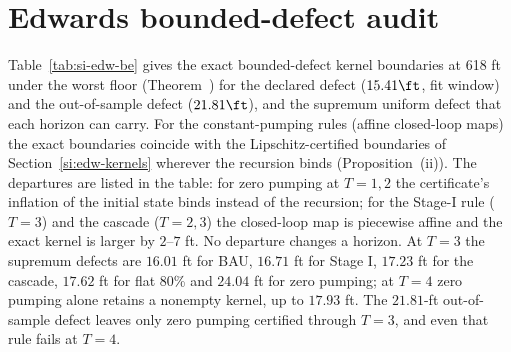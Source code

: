 \section{Edwards bounded-defect audit}\label{si:edw-be}
Table~\ref{tab:si-edw-be} gives the exact bounded-defect kernel boundaries at 618 ft under the worst floor (Theorem~) for the declared defect ($15.41\ft$, fit window) and the out-of-sample defect ($21.81\ft$), and the supremum uniform defect that each horizon can carry. For the constant-pumping rules (affine closed-loop maps) the exact boundaries coincide with the Lipschitz-certified boundaries of Section~\ref{si:edw-kernels} wherever the recursion binds (Proposition~(ii)). The departures are listed in the table: for zero pumping at $T=1,2$ the certificate's inflation of the initial state binds instead of the recursion; for the Stage-I rule ($T=3$) and the cascade ($T=2,3$) the closed-loop map is piecewise affine and the exact kernel is larger by $2$--$7$ ft. No departure changes a horizon. At $T=3$ the supremum defects are $16.01$ ft for BAU, $16.71$ ft for Stage I, $17.23$ ft for the cascade, $17.62$ ft for flat 80\% and $24.04$ ft for zero pumping; at $T=4$ zero pumping alone retains a nonempty kernel, up to $17.93$ ft. The $21.81$-ft out-of-sample defect leaves only zero pumping certified through $T=3$, and even that rule fails at $T=4$.

